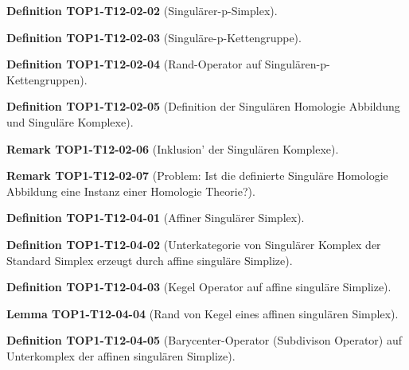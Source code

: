 \documentclass[10pt, letterpaper]{article}
\newcommand{\CustomHeading}[3]{%
  \par\medskip\noindent%
  \textbf{#1 #2} \textnormal{(#3)}.\enskip%
}
\newenvironment{DEF}[2]{\CustomHeading{Definition}{#1}{#2}}{}
\newenvironment{LEM}[2]{\CustomHeading{Lemma}{#1}{#2}}{}
\newenvironment{REM}[2]{\CustomHeading{Remark}{#1}{#2}}{}
\begin{document}
\begin{DEF}{TOP1-T12-02-02}{Singulärer-p-Simplex}
\end{DEF}

\begin{DEF}{TOP1-T12-02-03}{Singuläre-p-Kettengruppe}
\end{DEF}

\begin{DEF}{TOP1-T12-02-04}{Rand-Operator auf Singulären-p-Kettengruppen}
\end{DEF}

\begin{DEF}{TOP1-T12-02-05}{Definition der Singulären Homologie Abbildung und Singuläre Komplexe}
\end{DEF}

\begin{REM}{TOP1-T12-02-06}{Inklusion' der Singulären Komplexe}
\end{REM}

\begin{REM}{TOP1-T12-02-07}{Problem: Ist die definierte Singuläre Homologie Abbildung eine Instanz einer Homologie Theorie?}
\end{REM}

\begin{DEF}{TOP1-T12-04-01}{Affiner Singulärer Simplex}
\end{DEF}

\begin{DEF}{TOP1-T12-04-02}{Unterkategorie von Singulärer Komplex der Standard Simplex erzeugt durch affine singuläre Simplize}
\end{DEF}

\begin{DEF}{TOP1-T12-04-03}{Kegel Operator auf affine singuläre Simplize}
\end{DEF}

\begin{LEM}{TOP1-T12-04-04}{Rand von Kegel eines affinen singulären Simplex}
\end{LEM}

\begin{DEF}{TOP1-T12-04-05}{Barycenter-Operator (Subdivison Operator) auf Unterkomplex der affinen singulären Simplize}
\end{DEF}
\end{document}
